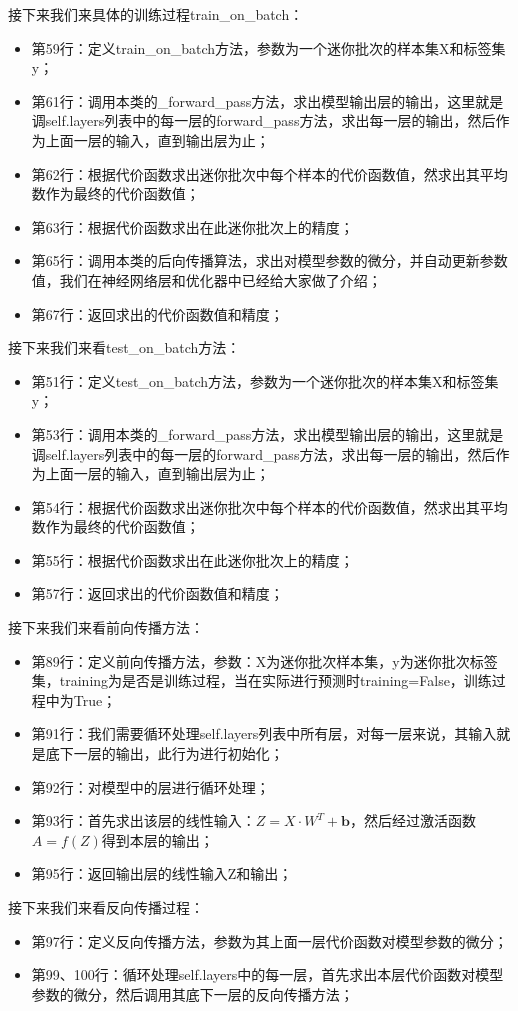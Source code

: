 \documentclass[UTF8]{article}
\begin{document}
接下来我们来具体的训练过程train\_on\_batch：
\begin{itemize}
\item 第59行：定义train\_on\_batch方法，参数为一个迷你批次的样本集X和标签集y；
\item 第61行：调用本类的\_forward\_pass方法，求出模型输出层的输出，这里就是调self.layers列表中的每一层的forward\_pass方法，求出每一层的输出，然后作为上面一层的输入，直到输出层为止；
\item 第62行：根据代价函数求出迷你批次中每个样本的代价函数值，然求出其平均数作为最终的代价函数值；
\item 第63行：根据代价函数求出在此迷你批次上的精度；
\item 第65行：调用本类的后向传播算法，求出对模型参数的微分，并自动更新参数值，我们在神经网络层和优化器中已经给大家做了介绍；
\item 第67行：返回求出的代价函数值和精度；
\end{itemize}
接下来我们来看test\_on\_batch方法：
\begin{itemize}
\item 第51行：定义test\_on\_batch方法，参数为一个迷你批次的样本集X和标签集y；
\item 第53行：调用本类的\_forward\_pass方法，求出模型输出层的输出，这里就是调self.layers列表中的每一层的forward\_pass方法，求出每一层的输出，然后作为上面一层的输入，直到输出层为止；
\item 第54行：根据代价函数求出迷你批次中每个样本的代价函数值，然求出其平均数作为最终的代价函数值；
\item 第55行：根据代价函数求出在此迷你批次上的精度；
\item 第57行：返回求出的代价函数值和精度；
\end{itemize}
接下来我们来看前向传播方法：
\begin{itemize}
\item 第89行：定义前向传播方法，参数：X为迷你批次样本集，y为迷你批次标签集，training为是否是训练过程，当在实际进行预测时training=False，训练过程中为True；
\item 第91行：我们需要循环处理self.layers列表中所有层，对每一层来说，其输入就是底下一层的输出，此行为进行初始化；
\item 第92行：对模型中的层进行循环处理；
\item 第93行：首先求出该层的线性输入：$Z=X \cdot W^{T} + \boldsymbol{b}$，然后经过激活函数$A=f(Z)$得到本层的输出；
\item 第95行：返回输出层的线性输入Z和输出；
\end{itemize}
接下来我们来看反向传播过程：
\begin{itemize}
\item 第97行：定义反向传播方法，参数为其上面一层代价函数对模型参数的微分；
\item 第99、100行：循环处理self.layers中的每一层，首先求出本层代价函数对模型参数的微分，然后调用其底下一层的反向传播方法；
\end{itemize}
\end{document}
